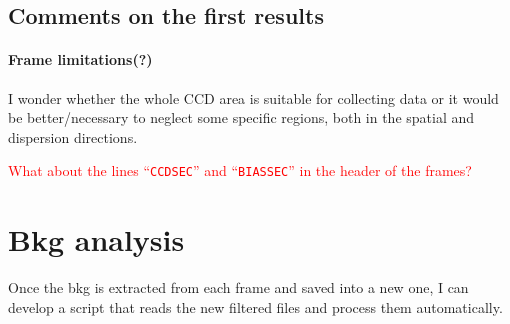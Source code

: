 \documentclass{article}
\begin{document}
\subsection{Comments on the first results}

\paragraph{Frame limitations(?)} I wonder whether the whole CCD area is suitable for collecting data or it would be better/necessary to neglect some specific regions, both in the spatial and dispersion directions.

\textcolor{red}{What about the lines ``\texttt{CCDSEC}'' and ``\texttt{BIASSEC}'' in the header of the frames?}


\section{Bkg analysis}
Once the bkg is extracted from each frame and saved into a new one, I can develop a script that reads the new filtered files and process them automatically.
\end{document}

